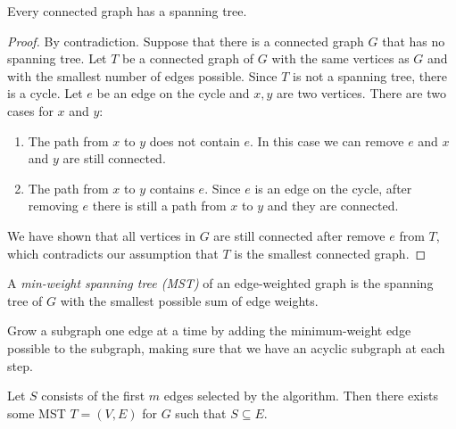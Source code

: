 \documentclass[11pt]{article}
\begin{document}
\begin{theorem}
Every connected graph has a spanning tree.
\end{theorem}

\begin{proof}
By contradiction. Suppose that there is a connected graph $G$ that has no spanning tree. Let $T$ be
a connected graph of $G$ with the same vertices as $G$ and with the smallest number of edges
possible. Since $T$ is not a spanning tree, there is a cycle. Let $e$ be an edge on the cycle and
$x,y$ are two vertices. There are two cases for $x$ and $y$:
\begin{enumerate}
\item The path from $x$ to $y$ does not contain $e$. In this case we can remove $e$ and $x$ and $y$
are still connected.
\item The path from $x$ to $y$ contains $e$. Since $e$ is an edge on the cycle, after removing $e$
there is still a path from $x$ to $y$ and they are connected.
\end{enumerate}
We have shown that all vertices in $G$ are still connected after remove $e$ from $T$, which
contradicts our assumption that $T$ is the smallest connected graph.
\end{proof}

\begin{definition}
A \emph{min-weight spanning tree (MST)} of an edge-weighted graph is the spanning tree of $G$ with
the smallest possible sum of edge weights.
\end{definition}

\begin{definition}
Grow a subgraph one edge at a time by adding the minimum-weight edge possible to the subgraph,
making sure that we have an acyclic subgraph at each step.
\end{definition}

\begin{lemma} \label{lemma:83}
Let $S$ consists of the first $m$ edges selected by the algorithm. Then there exists some MST $T=
(V,E)$ for $G$ such that $S \subseteq E$.
\end{lemma}
\end{document}
